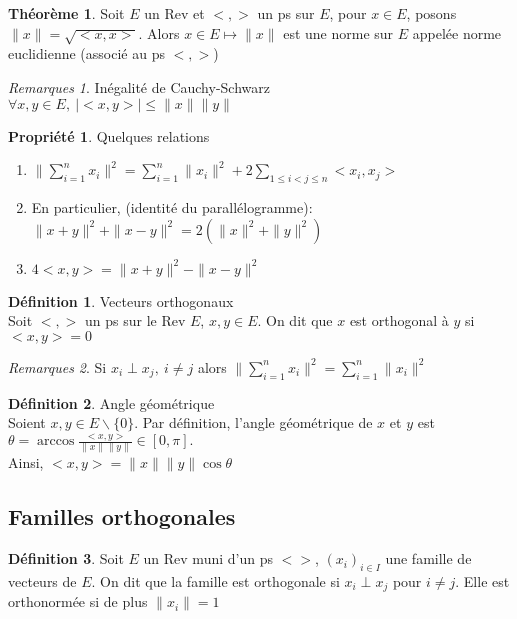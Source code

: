 \documentclass[fleqn]{article}
\theoremstyle{definition} \newtheorem*{defi}{D\'efinition}
\theoremstyle{definition} \newtheorem*{theo}{Th\'eor\`eme}
\theoremstyle{definition} \newtheorem*{coro}{Corollaire}
\theoremstyle{remark} \newtheorem*{rqs}{Remarques}
\theoremstyle{definition} \newtheorem*{prop}{Propri\'et\'e}
\begin{document}
\begin{theo} Soit $E$ un Rev et $<,>$ un ps sur $E$, pour $x \in E$, posons $\|x\| = \sqrt{<x,x>}$. Alors $x \in E \mapsto \|x\|$ est
une norme sur $E$ appel\'ee norme euclidienne (associ\'e au ps $<,>$)
\end{theo}

\begin{rqs} In\'egalit\'e de Cauchy-Schwarz\\
	$\forall x,y \in E,\ |<x,y>| \leq \|x\| \|y\|$
\end{rqs}

\begin{prop} Quelques relations
	\begin{enumerate}
		\item $\|\sum_{i=1}^n x_i \| ^2 = \sum_{i=1}^n \|x_i\|^2 + 2\sum_{1 \leq i < j \leq n} <x_i,x_j>$
		\item En particulier, (identit\'e du parall\'elogramme):\\
			$\|x+y\|^2 + \|x-y\|^2 = 2(\|x\|^2 + \|y\|^2)$
		\item $4<x,y> = \|x+y\|^2 - \|x-y\|^2$
	\end{enumerate}
\end{prop}

\begin{defi} Vecteurs orthogonaux \\
	Soit $<,>$ un ps sur le Rev $E$, $x,y \in E$.
	On dit que $x$ est orthogonal \`a $y$ si $<x,y> = 0$

	\begin{rqs}
		Si $x_i \perp x_j,\ i \neq j$ alors $\|\sum_{i=1}^n x_i \|^2 = \sum_{i=1}^n \|x_i\|^2$
	\end{rqs}
\end{defi}

\begin{defi} Angle g\'eom\'etrique \\
Soient $x,y \in E\backslash \{0\}$. Par d\'efinition, l'angle g\'eom\'etrique de $x$ et $y$ est $\theta = \arccos
\frac{<x,y>}{\|x\| \|y\|} \in [0, \pi].$\\
Ainsi, $<x,y> = \|x\| \|y\| \cos \theta$
\end{defi}

\subsection{Familles orthogonales}
\begin{defi} Soit $E$ un Rev muni d'un ps $<>$, $(x_i)_{i\in I}$ une famille de vecteurs de $E$. On dit que la famille est orthogonale si
$x_i \perp x_j$ pour $i\neq j$. Elle est orthonorm\'ee si de plus $\|x_i\| = 1$
\end{defi}
\end{document}
